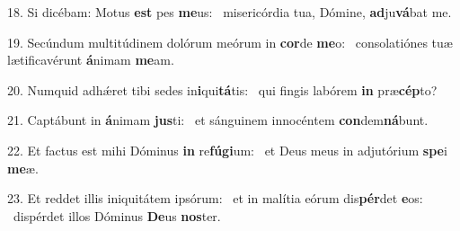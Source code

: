 18. Si dicébam: Motus \textbf{est} pes \textbf{me}us: \ast\  misericórdia tua, Dómine, \textbf{ad}ju\textbf{vá}bat me.\

19. Secúndum multitúdinem dolórum meórum in \textbf{cor}de \textbf{me}o: \ast\  consolatiónes tuæ lætificavérunt \textbf{á}nimam \textbf{me}am.\

20. Numquid adhǽret tibi sedes in\textbf{i}qui\textbf{tá}tis: \ast\  qui fingis labórem \textbf{in} præ\textbf{cép}to?\

21. Captábunt in \textbf{á}nimam \textbf{jus}ti: \ast\  et sánguinem innocéntem \textbf{con}dem\textbf{ná}bunt.\

22. Et factus est mihi Dóminus \textbf{in} re\textbf{fú}\textbf{gi}um: \ast\  et Deus meus in adjutórium \textbf{spe}i \textbf{me}æ.\

23. Et reddet illis iniquitátem ipsórum: \dag\  et in malítia eórum dis\textbf{pér}det \textbf{e}os: \ast\  dispérdet illos Dóminus \textbf{De}us \textbf{nos}ter.\

